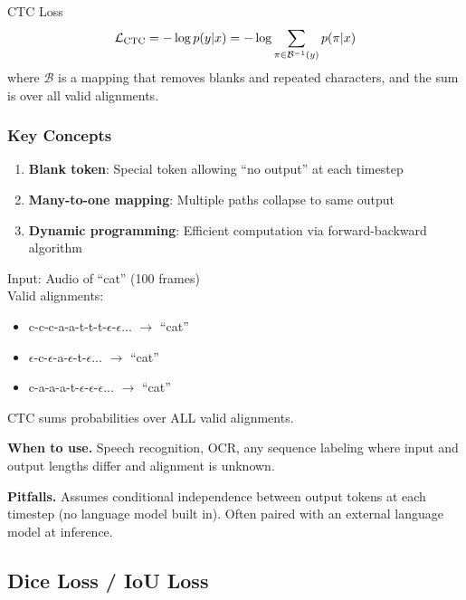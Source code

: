 \begin{mathresult}{CTC Loss}
\begin{equation}
\mathcal{L}_{\text{CTC}} = -\log p(y | x) = -\log \sum_{\pi \in \mathcal{B}^{-1}(y)} p(\pi | x)
\end{equation}
where $\mathcal{B}$ is a mapping that removes blanks and repeated characters, and the sum is over all valid alignments.
\end{mathresult}

\subsubsection{Key Concepts}

\begin{enumerate}
    \item \textbf{Blank token}: Special token allowing ``no output'' at each timestep
    \item \textbf{Many-to-one mapping}: Multiple paths collapse to same output
    \item \textbf{Dynamic programming}: Efficient computation via forward-backward algorithm
\end{enumerate}

\begin{example}
Input: Audio of ``cat'' (100 frames)\\
Valid alignments:
\begin{itemize}
    \item c-c-c-a-a-t-t-t-$\epsilon$-$\epsilon$... $\to$ ``cat''
    \item $\epsilon$-c-$\epsilon$-a-$\epsilon$-t-$\epsilon$... $\to$ ``cat''
    \item c-a-a-a-t-$\epsilon$-$\epsilon$-$\epsilon$... $\to$ ``cat''
\end{itemize}
CTC sums probabilities over ALL valid alignments.
\end{example}

\textbf{When to use.} Speech recognition, OCR, any sequence labeling where input and output lengths differ and alignment is unknown.

\textbf{Pitfalls.} Assumes conditional independence between output tokens at each timestep (no language model built in). Often paired with an external language model at inference.

\subsection{Dice Loss / IoU Loss}

